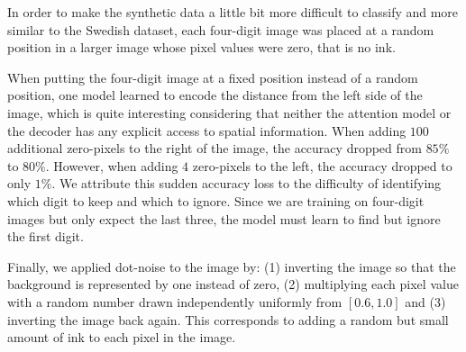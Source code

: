 In order to make the synthetic data a little bit more difficult to classify and more similar to the Swedish dataset, each four-digit image was placed at a random position in a larger image whose pixel values were zero, that is no ink.

When putting the four-digit image at a fixed position instead of a random position, one model learned to encode the distance from the left side of the image, which is quite interesting considering that neither the attention model or the decoder has any explicit access to spatial information.
When adding $100$ additional zero-pixels to the right of the image, the accuracy dropped from $85\%$ to $80\%$. However, when adding $4$ zero-pixels to the left, the accuracy dropped to only $1\%$. We attribute this sudden accuracy loss to the difficulty of identifying which digit to keep and which to ignore. Since we are training on four-digit images but only expect the last three, the model must learn to find but ignore the first digit.

Finally, we applied dot-noise to the image by:
(1) inverting the image so that the background is represented by one instead of zero,
(2) multiplying each pixel value with a random number drawn independently uniformly from $[0.6, 1.0]$ and
(3) inverting the image back again.
This corresponds to adding a random but small amount of ink to each pixel in the image.





